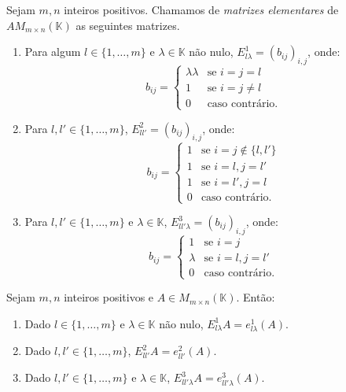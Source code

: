 \begin{definition}
    Sejam $m, n$ inteiros positivos.
    Chamamos de \emph{matrizes elementares} de $A M_{m \times n}(\mathbb K)$ as seguintes matrizes.
        \begin{enumerate}
            \item Para algum $l\in \{1, \ldots, m\}$ e $\lambda \in \mathbb K$ não nulo, $E_{l\lambda}^1=(b_{ij})_{i, j}$, onde:
            \begin{equation*}
                b_{ij} = \begin{cases}
                    \lambda \lambda & \text{se } i=j=l \\
                    1 & \text{se } i=j\neq l \\
                    0 & \text{caso contrário.}
            \end{cases}
            \end{equation*}
            \item Para $l, l'\in \{1, \ldots, m\}$, $E_{l l'}^2=(b_{ij})_{i, j}$, onde:
            \begin{equation*}
                b_{ij} = \begin{cases}
                    1 & \text{se } i=j\notin\{l, l'\} \\
                    1 & \text{se } i=l, j=l' \\
                    1 & \text{se } i=l', j=l \\
                    0 & \text{caso contrário.}
                \end{cases}
            \end{equation*}
            \item Para $l, l'\in \{1, \ldots, m\}$ e $\lambda \in \mathbb K$, $E_{l l'\lambda}^3=(b_{ij})_{i, j}$, onde:
            \begin{equation*}
                b_{ij} = \begin{cases}
                    1 & \text{se } i=j \\
                    \lambda & \text{se } i=l, j=l' \\
                    0 & \text{caso contrário.}
                \end{cases}
            \end{equation*}
        \end{enumerate}

        \begin{lemma}
            Sejam $m, n$ inteiros positivos e $A\in M_{m \times n}(\mathbb K)$.
            Então:
            \begin{enumerate}
                \item Dado $l\in \{1, \ldots, m\}$ e $\lambda \in \mathbb K$ não nulo, $E_{l\lambda}^1 A = e_{l\lambda}^1(A)$.
                \item Dado $l, l'\in \{1, \ldots, m\}$, $E_{l l'}^2 A = e_{l l'}^2(A)$.
                \item Dado $l, l'\in \{1, \ldots, m\}$ e $\lambda \in \mathbb K$, $E_{l l'\lambda}^3 A = e_{l l'\lambda}^3(A)$.
            \end{enumerate}
        \end{lemma}


\end{definition}
